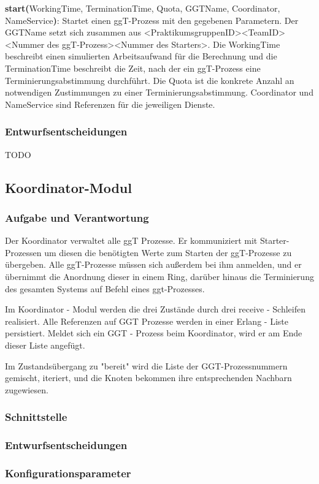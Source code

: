\documentclass{article}
\begin{document}
\textbf{start(}WorkingTime, TerminationTime, Quota, GGTName, Coordinator, NameService\textbf{)}: Startet einen
ggT-Prozess mit den gegebenen Parametern. Der GGTName setzt sich zusammen aus <PraktikumsgruppenID><TeamID><Nummer des ggT-Prozess><Nummer des Starters>.
Die WorkingTime beschreibt einen simulierten Arbeitsaufwand für die Berechnung und die TerminationTime beschreibt die
Zeit, nach der ein ggT-Prozess eine Terminierungsabstimmung durchführt. Die Quota ist die konkrete Anzahl an
notwendigen Zustimmungen zu einer Terminierungsabstimmung. Coordinator und NameService sind Referenzen für die
jeweiligen Dienste.\\

\subsubsection{Entwurfsentscheidungen}
TODO

\newpage

\subsection{Koordinator-Modul}
\subsubsection{Aufgabe und Verantwortung}

Der Koordinator verwaltet alle ggT Prozesse. Er kommuniziert mit Starter-Prozessen um diesen die benötigten
Werte zum Starten der ggT-Prozesse zu übergeben. Alle ggT-Prozesse müssen sich außerdem bei ihm anmelden,
und er übernimmt die Anordnung dieser in einem Ring, darüber hinaus die Terminierung des gesamten Systems auf Befehl eines
ggt-Prozesses.

Im Koordinator - Modul werden die drei Zustände durch drei receive - Schleifen realisiert. Alle Referenzen auf GGT
Prozesse werden in einer Erlang - Liste persistiert. Meldet sich ein GGT - Prozess beim Koordinator,
wird er am Ende dieser Liste angefügt.

Im Zustandsübergang zu "bereit" wird die Liste der GGT-Prozessnummern gemischt, iteriert,
und die Knoten bekommen ihre entsprechenden Nachbarn zugewiesen.


\subsubsection{Schnittstelle}

\subsubsection{Entwurfsentscheidungen}

\subsubsection{Konfigurationsparameter}
\end{document}
